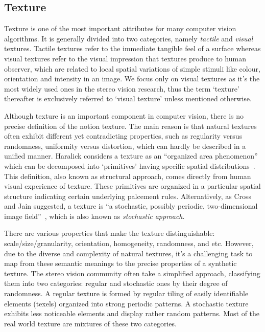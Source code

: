 \subsection{Texture}
Texture is one of the most important attributes for many computer vision algorithms. It is generally divided into two categories, namely \textit{tactile} and \textit{visual} textures. Tactile textures refer to the immediate tangible feel of a surface whereas visual textures refer to the visual impression that textures produce to human observer, which are related to local spatial variations of simple stimuli like colour, orientation and intensity in an image. We focus only on visual textures as it's the most widely used ones in the stereo vision research, thus the term `texture' thereafter is exclusively referred to `visual texture' unless mentioned otherwise.

Although texture is an important component in computer vision, there is no precise definition of the notion texture. The main reason is that natural textures often exhibit different yet contradicting properties, such as regularity versus randomness, uniformity versus distortion, which can hardly be described in a unified manner. Haralick considers a texture as an ``organized area phenomenon'' which can be decomposed into `primitives' having specific spatial distributions~\cite{haralick1979statistical}. This definition, also known as structural approach, comes directly from human visual experience of texture. These primitives are organized in a particular spatial structure indicating certain underlying palcement rules. Alternatively, as Cross and Jain suggested, a texture is ``a stochastic, possibly periodic, two-dimensional image field''~\cite{cross1983markov}, which is also known as \textit{stochastic approach}.


There are various properties that make the texture distinguishable: scale/size/granularity, orientation, homogeneity, randomness, and etc. However, due to the diverse and complexity of natural textures, it's a challenging task to map from these semantic meanings to the precise properties of a synthetic texture. The stereo vision community often take a simplified approach, classifying them into two categories: regular and stochastic ones by their degree of randomness. A regular texture is formed by regular tiling of easily identifiable elements (texels) organized into strong periodic patterns. A stochastic texture exhibits less noticeable elements and display rather random patterns. Most of the real world texture are mixtures of these two categories.

